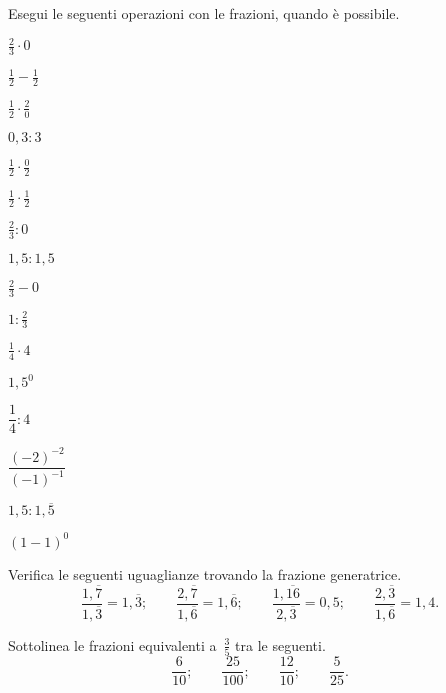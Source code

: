 \begin{esercizio}
Esegui le seguenti operazioni con le frazioni, quando è possibile.

\begin{htmulticols}{4}
\begin{enumeratees}
\spazielenx
\item \(\displaystyle{\frac{2}{3}\cdot0}\)
\item \(\displaystyle{\frac{1}{2}-\frac{1}{2}}\)
\item \(\displaystyle{\frac{1}{2}\cdot\frac{2}{0}}\)
\item \(0,3:3\)
\item \(\displaystyle{\frac{1}{2}}\cdot\frac{0}{2}\)
\item \(\displaystyle{\frac{1}{2}\cdot\frac{1}{2}}\)
\item \(\displaystyle{\frac{2}{3}:0}\)
\item \(1,5:1,5\)
\item \(\displaystyle{\frac{2}{3}-0}\)
\item \(\displaystyle{1:\frac{2}{3}}\)
\item \(\displaystyle{\frac{1}{4}\cdot4}\)
\item \(1,5^0\)
\item \(\dfrac{1}{4}:4\)
\item \(\dfrac{(-2)^{-2}}{(-1)^{-1}}\)
\item \(\displaystyle{1,5 : 1,\overline{5}}\)
\item \((1-1)^0\)
\end{enumeratees}
\end{htmulticols}
\end{esercizio}

\begin{esercizio}
Verifica le seguenti uguaglianze trovando la frazione generatrice.
\[\frac{1,\overline{7}}{1,\overline{3}}=1,\overline{3};\qquad%
\frac{2,\overline{7}}{1,\overline{6}}=1,\overline{6};\qquad%
\frac{1,\overline{16}}{2,\overline{3}}=0,5;\qquad%
\frac{2,\overline{3}}{1,\overline{6}}=1,4.\]
\end{esercizio}


\begin{esercizio}
Sottolinea le frazioni equivalenti a~\(\frac{3}{5}\) tra le seguenti.
\[\frac{6}{10};\qquad\frac{25}{100};\qquad\frac{12}{10};
\qquad\frac{5}{25}.\]
\end{esercizio}

